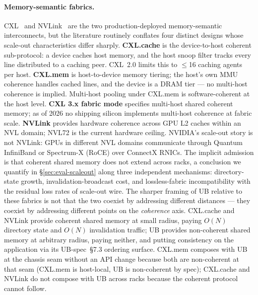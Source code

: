 \documentclass[10pt,twocolumn]{article}
\newcommand{\specsec}[1]{UB-spec~\S#1}
\begin{document}
\paragraph{Memory-semantic fabrics.}
CXL~\cite{cxl} and NVLink~\cite{nvlink} are the two
production-deployed memory-semantic interconnects, but the
literature routinely conflates four distinct designs whose
scale-out characteristics differ sharply.
\textbf{CXL.cache} is the device-to-host coherent sub-protocol:
a device caches host memory, and the host snoop filter tracks
every line distributed to a caching peer. CXL~2.0 limits this
to $\le$16 caching agents per host.
\textbf{CXL.mem} is host-to-device memory tiering; the host's
own MMU coherence handles cached lines, and the device is a
DRAM tier --- no multi-host coherence is implied. Multi-host
pooling under CXL.mem is software-coherent at the host level.
\textbf{CXL 3.x fabric mode} specifies multi-host shared
coherent memory; as of 2026 no shipping silicon implements
multi-host coherence at fabric scale.
\textbf{NVLink} provides hardware coherence across GPU L2
caches within an NVL domain; NVL72 is the current
hardware ceiling. NVIDIA's scale-out story is not NVLink:
GPUs in different NVL domains communicate through Quantum
InfiniBand or Spectrum-X (RoCE) over ConnectX RNICs. The
implicit admission is that coherent shared memory does not
extend across racks, a conclusion we quantify in
\S\ref{sec:eval-scaleout} along three independent
mechanisms: directory-state growth, invalidation-broadcast
cost, and lossless-fabric incompatibility with the residual
loss rates of scale-out wire. The sharper framing of UB
relative to these fabrics is not that the two coexist by
addressing different distances --- they coexist by addressing
different points on the \emph{coherence} axis. CXL.cache and
NVLink provide coherent shared memory at small radius, paying
$O(N)$ directory state and $O(N)$ invalidation traffic; UB
provides non-coherent shared memory at arbitrary radius,
paying neither, and putting consistency on the application via
its \specsec{7.3} ordering surface. CXL.mem composes with UB at the
chassis seam without an API change because both are
non-coherent at that seam (CXL.mem is host-local, UB is
non-coherent by spec); CXL.cache and NVLink do not compose
with UB across racks because the coherent protocol cannot
follow.
\end{document}
